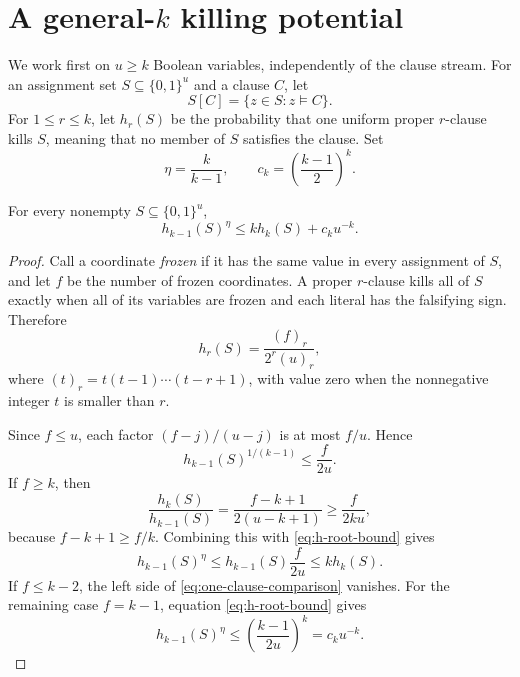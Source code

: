 \section{A general-\texorpdfstring{$k$}{k} killing potential}
\label{sec:potential}

We work first on $u\ge k$ Boolean variables, independently of the clause
stream.  For an assignment set $S\subseteq\{0,1\}^u$ and a clause $C$, let
\[
    S[C]=\{z\in S:z\models C\}.
\]
For $1\le r\le k$, let $h_r(S)$ be the probability that one uniform proper
$r$-clause kills $S$, meaning that no member of $S$ satisfies the clause.
Set
\[
    \eta=\frac{k}{k-1},
    \qquad
    c_k=\left(\frac{k-1}{2}\right)^k.
\]

\begin{lemma}
\label{lem:one-clause}
For every nonempty $S\subseteq\{0,1\}^u$,
\begin{equation}
    h_{k-1}(S)^\eta
    \le k h_k(S)+c_k u^{-k}.
    \label{eq:one-clause-comparison}
\end{equation}
\end{lemma}

\begin{proof}
Call a coordinate \emph{frozen} if it has the same value in every assignment
of $S$, and let $f$ be the number of frozen coordinates.  A proper
$r$-clause kills all of $S$ exactly when all of its variables are frozen and
each literal has the falsifying sign.  Therefore
\begin{equation}
    h_r(S)=\frac{(f)_r}{2^r(u)_r},
    \label{eq:frozen-formula}
\end{equation}
where $(t)_r=t(t-1)\cdots(t-r+1)$, with value zero when the nonnegative
integer $t$ is smaller than $r$.

Since $f\le u$, each factor $(f-j)/(u-j)$ is at most $f/u$.  Hence
\begin{equation}
    h_{k-1}(S)^{1/(k-1)}\le \frac{f}{2u}.
    \label{eq:h-root-bound}
\end{equation}
If $f\ge k$, then
\[
    \frac{h_k(S)}{h_{k-1}(S)}
    =\frac{f-k+1}{2(u-k+1)}
    \ge \frac{f}{2ku},
\]
because $f-k+1\ge f/k$.  Combining this with
\eqref{eq:h-root-bound} gives
\[
    h_{k-1}(S)^\eta
    \le h_{k-1}(S)\frac{f}{2u}
    \le k h_k(S).
\]
If $f\le k-2$, the left side of \eqref{eq:one-clause-comparison} vanishes.
For the remaining case $f=k-1$, equation \eqref{eq:h-root-bound} gives
\[
    h_{k-1}(S)^\eta
    \le \left(\frac{k-1}{2u}\right)^k
    =c_k u^{-k}.
\]
\end{proof}

